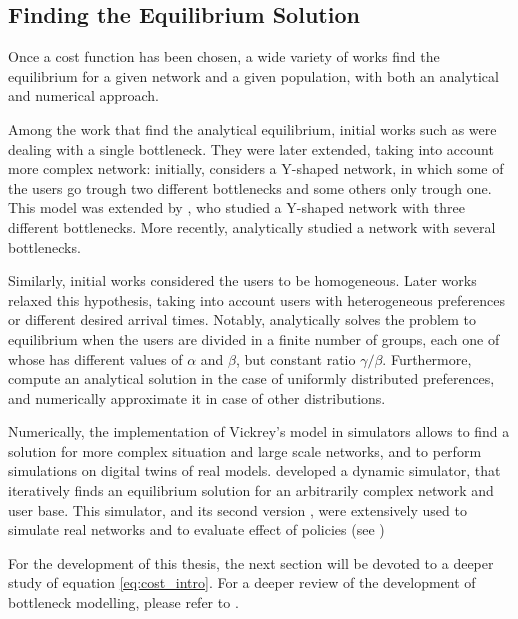 \subsection{Finding the Equilibrium Solution}


Once a cost function has been chosen, a wide variety of works find the equilibrium for a given network and a given population,
with both an analytical and numerical approach.

Among the work that find the analytical equilibrium, initial works such as \textcite{de1983stochastic} were dealing with a single bottleneck.
They were later extended, taking into account more complex network: initially, \textcite{doi:10.1287/trsc.24.3.217} considers a Y-shaped network,
in which some of the users go trough two different bottlenecks and some others only trough one.
This model was extended by \textcite{doi:10.1287/trsc.27.2.148},
who studied a Y-shaped network with three different bottlenecks.
More recently, \textcite{AKAMATSU2015808} analytically studied a network with several bottlenecks.

Similarly, initial works considered the users to be homogeneous.
Later works relaxed this hypothesis, taking into account users with heterogeneous preferences or different desired arrival times.
Notably, \textcite{arnott1988schedule} analytically solves the problem to equilibrium when the users are divided in a finite number of groups,
each one of whose has different values of \(\alpha\) and \(\beta\),
but constant ratio \(\gamma/\beta\).
Furthermore, \textcite{amirgholy2017analytical} compute an analytical solution in the case of uniformly distributed preferences,
and numerically approximate it in case of other distributions.

Numerically, the implementation of Vickrey's model in simulators allows to find a solution for more complex situation and large scale networks,
and to perform simulations on digital twins of real models.
\textcite{de1997metropolis} developed a dynamic simulator, that iteratively finds an equilibrium solution for an arbitrarily complex network and user base.
This simulator, and its second version \parencite{RePEc:ema:worpap:2024-03},
were extensively used to simulate real networks and to evaluate effect of policies (see \cite{de2002real,de2005congestion,de2006modelling})

For the development of this thesis,
the next section will be devoted to a deeper study of equation \eqref{eq:cost_intro}.
For a deeper review of the development of bottleneck modelling, please refer to \cite{LI2020311}.

